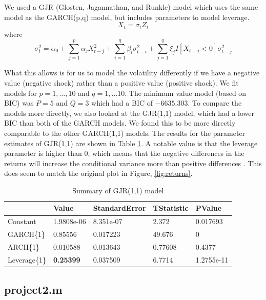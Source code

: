 \documentclass{article}
\begin{document}
We used a GJR (Glosten, Jagannathan, and Runkle) \cite{gjr1993} model which uses the same model as the GARCH(p,q) model, but includes parameters to model leverage.
$$
X_t = \sigma_t Z_t
$$
where
$$
\sigma_t^2 = \alpha_0 + \sum_{j = 1}^p \alpha_j X_{t - j}^2 + \sum_{i = 1}^q \beta_i \sigma_{t - i}^2 + \sum_{j = 1}^q \xi_j I [X_{t - j} < 0] \sigma_{t - j}^2
$$

What this allows is for us to model the volatility differently if we have a negative value (negative shock) rather than a positive value (positive shock).
We fit models for $p = 1,\ldots, 10$ and $q = 1,\ldots 10$. The minimum value model (based on BIC) was $P = 5$ and $Q = 3$ which had a BIC of $-6635.303$.
To compare the models more directly, we also looked at the GJR(1,1) model, which had a lower BIC than both of the GARCH models.
We found this to be more directly comparable to the other GARCH(1,1) models.
The results for the parameter estimates of GJR(1,1) are shown in Table \ref{tab:gjr_summary}.
A notable value is that the leverage parameter is higher than 0, which means that the negative differences in the returns will increase the conditional variance more than positive differences \cite{leverage2017}.
This does seem to match the original plot in Figure, \ref{fig:returns}.

\begin{table}[H]
  \centering
\begin{tabular}{l | l l l l}
  & Value & StandardError  &  TStatistic  &    PValue                      \\
  \hline
Constant & 1.9808e-06   &   8.351e-07    &     2.372    &    0.017693   \\
GARCH\{1\}    &      0.85556   &    0.017223   &     49.676    &           0 \\
ARCH\{1\}    &      0.010588   &    0.013643   &    0.77608   &       0.4377 \\
Leverage\{1\}   &    \textbf{0.25399}   &    0.037509   &     6.7714  &    1.2755e-11
\end{tabular}
\caption{Summary of GJR(1,1) model}
\label{tab:gjr_summary}
\end{table}

\begin{appendices}

\subsection{project2.m}


\end{appendices}



\end{document}
